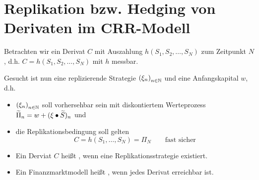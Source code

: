 \section{Replikation bzw. Hedging von Derivaten im CRR-Modell}

Betrachten wir ein Derivat $C$ mit Auszahlung $h(S_1, S_2, \dots, S_N)$ zum Zeitpunkt $N$, d.h. $C = h(S_1, S_2, \dots, S_N)$ mit $h$ messbar.

Gesucht ist nun eine replizierende Strategie $\left( \xi_n \right)_{n \in \mathbb{N}}$ und eine Anfangskapital $w$, d.h.
\begin{itemize}[label = --, nolistsep, topsep=-\parskip]
	\item $\left( \xi_n \right)_{n \in \mathbb{N}}$ soll vorhersehbar sein mit diskontiertem Werteprozess $\widetilde{\Pi}_n = w + (\xi \bullet \widetilde{S})_n$ und 
	\item die Replikationsbedingung soll gelten
	\begin{equation*}
	C = h(S_1, \dots, S_N) = \Pi_N  \qquad \text{fast sicher} \tag{Rep} \label{eq: 2_2_rep}
	\end{equation*}
\end{itemize} 

\begin{*definition}
	\begin{itemize}[nolistsep, topsep=-\parskip]
		\item Ein Derviat $C$ heißt , wenn eine Replikationsstrategie existiert.
		\item Ein Finanzmarktmodell heißt , wenn jedes Derivat erreichbar ist.
	\end{itemize}
\end{*definition}

